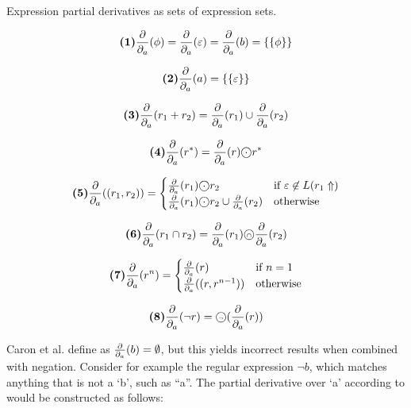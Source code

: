 \begin{defn}
   \label{defn-pd-eset}
   Expression partial derivatives as sets of expression sets.

   \begin{minipage}[t]{0.4\textwidth}
      \[\textbf{(1)} \frac{\partial}{\partial_{a}}(\phi) = \frac{\partial}{\partial_{a}}(\varepsilon) = \frac{\partial}{\partial_{a}}(b) = \{\{ \phi \}\}\]
   \end{minipage}
   \begin{minipage}[t]{0.4\textwidth}
      \[\textbf{(2)} \frac{\partial}{\partial_{a}}(a) = \{\{ \varepsilon \}\}\]
   \end{minipage}

   \begin{minipage}[t]{0.4\textwidth}
      \[\textbf{(3)} \frac{\partial}{\partial_{a}}(r_1 + r_2) = \frac{\partial}{\partial_{a}}(r_1) \cup \frac{\partial}{\partial_{a}}(r_2)\]
   \end{minipage}
   \begin{minipage}[t]{0.4\textwidth}
      \[\nr{4} \dda(r^*) = \dda(r) \circledcdot r^*\]
   \end{minipage}

   \begin{minipage}[t]{0.6\textwidth}
      \[\nr{5} \dda((r_1, r_2)) =
          \begin{cases}
             \dda(r_1) \circledcdot r_2 & \text{if } \varepsilon \not\in L(r_1\esetsOfRe) \\
             \dda(r_1) \circledcdot r_2 \cup \dda(r_2) & \text{otherwise}
          \end{cases}
      \]
   \end{minipage}
   \begin{minipage}[t]{0.3\textwidth}
      \[\textbf{(6)} \frac{\partial}{\partial_{a}}(r_1 \cap r_2) = \frac{\partial}{\partial_{a}}(r_1) \text{\textcircled{\tiny$\cap$}} \frac{\partial}{\partial_{a}}(r_2)\]
   \end{minipage}

   \begin{minipage}[t]{0.4\textwidth}
      \[\textbf{(7)} \frac{\partial}{\partial_{a}}(r^n) =
          \begin{cases}
             \frac{\partial}{\partial_{a}}(r) & \text{if } n = 1 \\
             \frac{\partial}{\partial_{a}}((r, r^{n-1})) & \text{otherwise}
          \end{cases}
      \]
   \end{minipage}
   \begin{minipage}[t]{0.4\textwidth}
      \[\textbf{(8)} \frac{\partial}{\partial_{a}}(\neg r) = \text{\textcircled{\tiny$\neg$}} (\frac{\partial}{\partial_{a}}(r))\]
   \end{minipage}
\end{defn}

Caron et al. define  as $\frac{\partial}{\partial_{a}}(b) = \emptyset$, but this yields incorrect
results when combined with negation. Consider for example the regular expression
$\neg b$, which matches anything that is not a `b', such as ``a''.  The partial
derivative over `a' according to \cite{pdere} would be constructed as follows:

